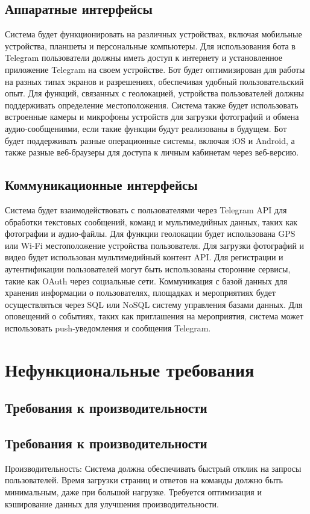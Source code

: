 \documentclass{scrreprt}
\begin{document}
\section{Аппаратные интерфейсы}
Система будет функционировать на различных устройствах, включая мобильные устройства, планшеты и персональные компьютеры. Для использования бота в Telegram пользователи должны иметь доступ к интернету и установленное приложение Telegram на своем устройстве. Бот будет оптимизирован для работы на разных типах экранов и разрешениях, обеспечивая удобный пользовательский опыт. Для функций, связанных с геолокацией, устройства пользователей должны поддерживать определение местоположения. Система также будет использовать встроенные камеры и микрофоны устройств для загрузки фотографий и обмена аудио-сообщениями, если такие функции будут реализованы в будущем. Бот будет поддерживать разные операционные системы, включая iOS и Android, а также разные веб-браузеры для доступа к личным кабинетам через веб-версию.

\section{Коммуникационные интерфейсы}
Система будет взаимодействовать с пользователями через Telegram API для обработки текстовых сообщений, команд и мультимедийных данных, таких как фотографии и аудио-файлы. Для функции геолокации будет использована GPS или Wi-Fi местоположение устройства пользователя. Для загрузки фотографий и видео будет использован мультимедийный контент API. Для регистрации и аутентификации пользователей могут быть использованы сторонние сервисы, такие как OAuth через социальные сети. Коммуникация с базой данных для хранения информации о пользователях, площадках и мероприятиях будет осуществляться через SQL или NoSQL систему управления базами данных. Для оповещений о событиях, таких как приглашения на мероприятия, система может использовать push-уведомления и сообщения Telegram.

\chapter{Нефункциональные требования}

\section{Требования к производительности}

\section{Требования к производительности}
 Производительность: Система должна обеспечивать быстрый отклик на запросы пользователей. Время загрузки страниц и ответов на команды должно быть минимальным, даже при большой нагрузке. Требуется оптимизация и кэширование данных для улучшения производительности.
 
\end{document}
